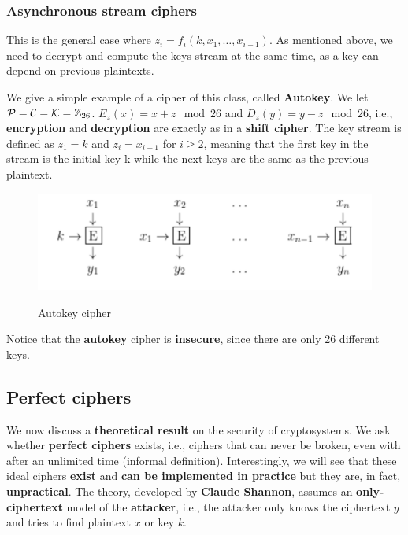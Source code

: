 \subsubsection{Asynchronous stream ciphers}
This is the general case where $z_i = f_i(k,x_1,\ldots,x_{i-1})$. As mentioned above, we need to decrypt and compute the keys stream at the same time, as a key can depend on previous plaintexts. 

We give a simple example of a cipher of this class, called \textbf{Autokey}. We let ${\cal P}={\cal C}={\cal K}=\mathbb{Z}_{26}$. $E_z(x) = x+z \mod 26$ and $D_z(y) = y-z \mod 26$, i.e., \textbf{encryption} and \textbf{decryption} are exactly as in a \textbf{shift cipher}. The key stream is defined as $z_1 = k$ and $z_i = x_{i-1}$ for $i\geq 2$, meaning that the first key in the stream is the initial key k while the next keys are the same as the previous plaintext.

\begin{figure}[h!]
        \centering
        \includegraphics[scale = 1.0]{img/stream4.png}
        \label{stream4}
        \caption{Autokey cipher}
\end{figure}


Notice that the \textbf{autokey} cipher is \textbf{insecure}, since there are only 26 different keys.

\subsection{Perfect ciphers}
We now discuss a \textbf{theoretical result} on the security of cryptosystems. We ask whether \textbf{perfect ciphers} exists, i.e., ciphers that can never be broken, even with after an unlimited time (informal definition). Interestingly, we will see that these ideal ciphers \textbf{exist} and \textbf{can be implemented in practice} but they are, in fact, \textbf{unpractical}. The theory, developed by \textbf{Claude Shannon}, assumes an \textbf{only-ciphertext} model of the \textbf{attacker}, i.e., the attacker only knows the ciphertext $y$ and tries to find plaintext $x$ or key $k$.


